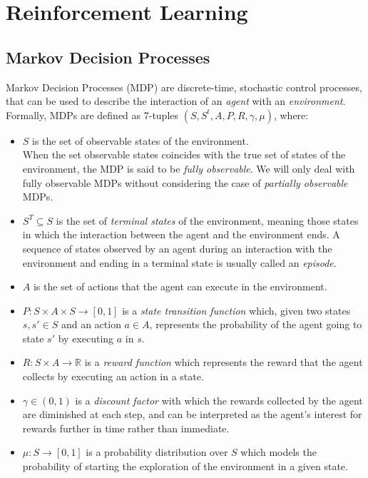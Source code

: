 \section{Reinforcement Learning}

\subsection{Markov Decision Processes}
Markov Decision Processes (MDP) are discrete-time, stochastic control 
processes, that can be used to describe the interaction of an \textit{agent} 
with an \textit{environment}. \\

Formally, MDPs are defined as 7-tuples $(S, S^{t}, A, P, R, \gamma, \mu)$, 
where:
\begin{itemize}
    \item $S$ is the set of observable states of the environment. \\
    When the set observable states coincides with the true set of states of the 
    environment, the MDP is said to be \textit{fully observable}. We will only deal 
    with fully observable MDPs without considering the case of \textit{partially 
    observable} MDPs.

    \item $S^{T} \subseteq S$ is the set of \textit{terminal states} of the 
    environment, meaning those states in which the interaction between the agent and 
    the environment ends. A sequence of states observed by an agent during an 
    interaction with the environment and ending in a terminal state is usually 
    called an \textit{episode}.
 
    \item $A$ is the set of actions that the agent can execute in the environment.
 
    \item $P: S \times A \times S \rightarrow [0,1]$ is a \textit{state transition 
    function} which, given two states $s, s' \in S$ and an action $a \in A$, 
    represents the probability of the agent going to state $s'$ by executing $a$ in 
    $s$. \\
 
    \item $R: S \times A \rightarrow \mathbb{R}$ is a \textit{reward function} 
    which represents the reward that the agent collects by executing an action in 
    a state. 
    
    \item $\gamma \in (0,1)$ is a \textit{discount factor} with which the rewards 
    collected by the agent are diminished at each step, and can be interpreted as 
    the agent's interest for rewards further in time rather than immediate.
    
    \item $\mu: S \rightarrow [0, 1]$ is a probability distribution over $S$ which 
    models the probability of starting the exploration of the environment in a 
    given state.
\end{itemize}

